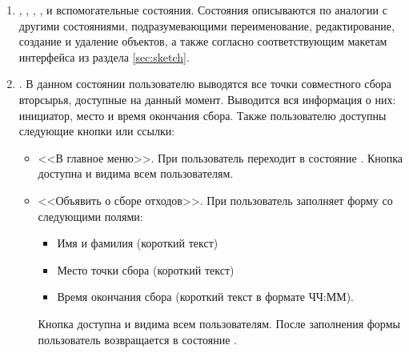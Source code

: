 \begin{enumerate}
        \item
            \label{itm:req:ui:states:rename-event}
            ,
            \label{itm:req:ui:states:edit-event-date}
            ,
            \label{itm:req:ui:states:edit-event-desc}
            ,
            \label{itm:req:ui:states:delete-event}
            ,
            \label{itm:req:ui:states:create-event}
            и вспомогательные состояния.
            Состояния описываются по аналогии с другими состояниями, подразумевающими переименование,
            редактирование, создание и удаление объектов, а также согласно соответствующим макетам интерфейса
            из раздела \ref{sec:sketch}.

        \item \label{itm:req:ui:states:gc}
            .
            В данном состоянии пользователю выводятся все точки совместного сбора вторсырья,
            доступные на данный момент. Выводится вся информация о них: инициатор,
            место и время окончания сбора.
            Также пользователю доступны следующие кнопки или ссылки:
            \begin{itemize}
                \item
                    <<В главное меню>>.
                    При  пользователь переходит в состояние
                    \hyperref[itm:req:ui:states:mainmenu]
                    {}.
                    Кнопка доступна и видима всем пользователям.
                \item
                    <<Объявить о сборе отходов>>.
                    При  пользователь заполняет форму со следующими полями:
                    \begin{itemize}
                        \item
                            Имя и фамилия (короткий текст)
                        \item
                            Место точки сбора (короткий текст)
                        \item
                            Время окончания сбора (короткий текст в формате ЧЧ:ММ).
                    \end{itemize}
                    Кнопка доступна и видима всем пользователям. После заполнения формы
                    пользователь возвращается в состояние
                    \hyperref[itm:req:ui:states:gc]
                    {}.
            \end{itemize}
    \end{enumerate}

